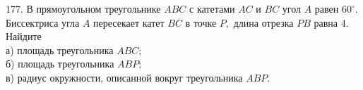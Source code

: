 177. В прямоугольном треугольнике $ABC$ с катетами $AC$ и $BC$ угол $A$ равен $60^\circ.$ Биссектриса угла $A$ пересекает катет $BC$ в точке $P,$ длина отрезка $PB$ равна 4. Найдите\\
а) площадь треугольника $ABC;$\\
б) площадь треугольника $ABP;$\\
в) радиус окружности, описанной вокруг треугольника $ABP.$\\
